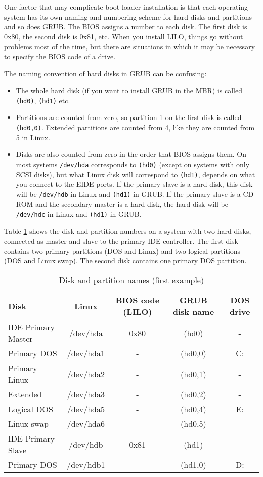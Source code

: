 \documentclass[12pt,a4paper]{article}
\begin{document}
One factor that may complicate boot loader installation is that each
operating system has its own naming and numbering scheme for hard disks and
partitions and so does GRUB. The BIOS assigns a number to each
disk. The first disk is 0x80, the second disk is 0x81, etc. When you
install LILO, things go without problems most of the time, but there
are situations in which it may be necessary to specify the BIOS code
of a drive. 

The naming convention of hard disks in GRUB can be confusing:
\begin{itemize}
\item The whole hard disk (if you want to install GRUB in the MBR) is
  called {\tt (hd0)}, {\tt (hd1)} etc.
\item Partitions are counted from zero, so partition 1 on the first disk
  is called {\tt (hd0,0)}. Extended partitions are counted from 4,
  like they are counted from 5 in Linux.
\item Disks are also counted from zero in the order that BIOS assigns
  them. On most systems {\tt /dev/hda} corresponds to {\tt (hd0)}
  (except on systems with only SCSI disks), but
  what Linux disk will correspond to {\tt (hd1)}, depends on what you
  connect to the EIDE ports. If the primary slave is a hard disk, this
  disk will be {\tt /dev/hdb} in Linux and {\tt (hd1)} in GRUB. If the
  primary slave is a CD-ROM and the secondary master is a hard disk,
  the hard disk will be {\tt /dev/hdc} in Linux and {\tt (hd1)} in
  GRUB.
\end{itemize}

Table \ref{partexampl1} shows the disk and partition numbers on a
system with two hard disks, connected as master and slave to the
primary IDE controller. The first disk contains two primary partitions
(DOS and Linux) and two logical partitions (DOS and Linux swap). The
second disk contains one primary DOS partition.

\begin{table}
{\small
\begin{tabular}{|l|c|c|c|c|}
\hline
Disk & Linux & BIOS code (LILO) & GRUB disk name&DOS drive\\
\hline
IDE Primary Master & /dev/hda & 0x80 & (hd0)    & -\\
Primary DOS        & /dev/hda1& -    & (hd0,0)  & C:\\
Primary Linux      & /dev/hda2& -    & (hd0,1)  & -\\
Extended           & /dev/hda3& -    & (hd0,2)  & -\\
Logical DOS        & /dev/hda5& -    & (hd0,4)  & E:\\
Linux swap         & /dev/hda6& -    & (hd0,5)  & -\\
\hline
IDE Primary Slave  & /dev/hdb & 0x81 & (hd1)    & -\\
Primary DOS        & /dev/hdb1& -    & (hd1,0)  & D:\\
\hline
\end{tabular}}
\caption{\label{partexampl1}Disk and partition names (first example)} 
\end{table}
\end{document}
